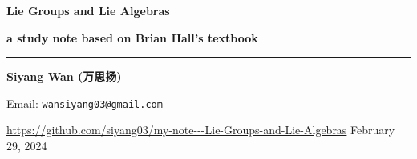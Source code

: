 \begin{titlepage}
	\vspace*{100pt}
	
	{\Huge \textbf{Lie Groups and Lie Algebras}}
	
	\vspace{10pt}
	
	{\LARGE \textbf{a study note based on Brian Hall's textbook}}
	
	\vspace{20pt}
	
	\noindent\rule[0.5ex]{\linewidth}{1.5pt} %
	
	\vspace{20pt}
	
	{\large \textbf{Siyang Wan (万思扬)}}
	
	\vfill
	
	Email: \href{mailto:wansiyang03@gmail.com}{\texttt{wansiyang03@gmail.com}}
	
	\url{https://github.com/siyang03/my-note---Lie-Groups-and-Lie-Algebras} \hfill February 29, 2024
\end{titlepage}
